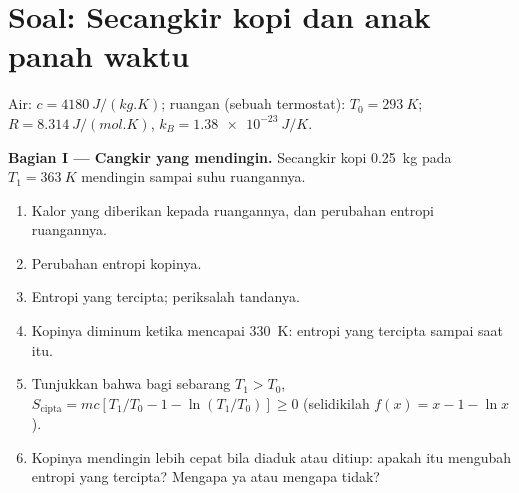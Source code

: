 \section{Soal: Secangkir kopi dan anak panah waktu}

\begin{problem}
\label{pb:b1:second-law-entropy:1}
Air: $c = \qty{4180}{J/(kg.K)}$; ruangan (sebuah termostat): $T_0 = \qty{293}{K}$;
$R = \qty{8.314}{J/(mol.K)}$, $k_B = \qty{1.38e-23}{J/K}$.

\medskip
\noindent\textbf{Bagian I --- Cangkir yang mendingin.}
Secangkir kopi \qty{0.25}{kg} pada $T_1 = \qty{363}{K}$ mendingin sampai suhu
ruangannya.
\begin{enumerate}
  \item Kalor yang diberikan kepada ruangannya, dan perubahan entropi ruangannya.
  \item Perubahan entropi kopinya.
  \item Entropi yang tercipta; periksalah tandanya.
  \item Kopinya diminum ketika mencapai \qty{330}{K}: entropi yang tercipta sampai
        saat itu.
  \item Tunjukkan bahwa bagi sebarang $T_1 > T_0$, $S_{\mathrm{cipta}} = mc[T_1/T_0 - 1 -
        \ln(T_1/T_0)] \geq 0$ (selidikilah $f(x) = x - 1 - \ln x$).
  \item Kopinya mendingin lebih cepat bila diaduk atau ditiup: apakah itu mengubah
        entropi yang tercipta? Mengapa ya atau mengapa tidak?
\end{enumerate}


\end{problem}
